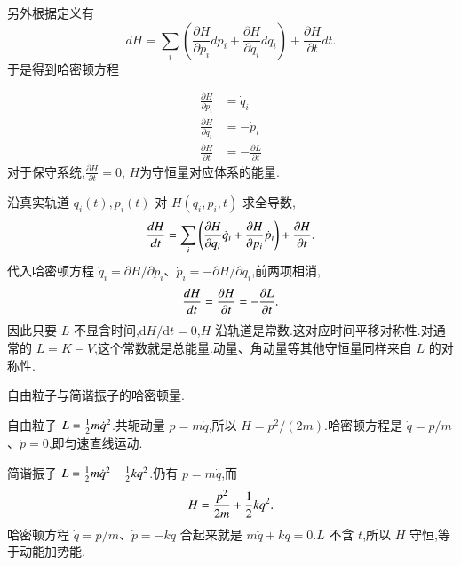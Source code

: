 另外根据定义有
\begin{equation}
    d H=\sum_i\left(\frac{\partial H}{\partial p_i} d p_i+\frac{\partial H}{\partial q_i} d q_i\right)+\frac{\partial H}{\partial t} d t .
\end{equation}
于是得到哈密顿方程

\begin{align}
    \frac{\partial H}{\partial p_i}&=\dot{q}_i
    \\
    \frac{\partial H}{\partial q_i}&=-\dot{p}_i
    \\
    \frac{\partial H}{\partial t}&=-\frac{\partial L}{\partial t}
\end{align}
对于保守系统,$\frac{\partial H}{\partial t}=0$, $H$为守恒量对应体系的能量.

沿真实轨道 $q_i(t),p_i(t)$ 对 $H(q_i,p_i,t)$ 求全导数,
\begin{equation}
  \frac{d{H}}{d{t}}
  = \sum_i\left( \frac{\partial{H}}{\partial{q_i}}\dot q_i + \frac{\partial{H}}{\partial{p_i}}\dot p_i \right)
    + \frac{\partial{H}}{\partial{t}}.
\end{equation}
代入哈密顿方程 $\dot q_i=\partial H/\partial p_i$、$\dot p_i=-\partial H/\partial q_i$,前两项相消,
\begin{equation}
  \frac{d{H}}{d{t}} = \frac{\partial{H}}{\partial{t}} = -\frac{\partial{L}}{\partial{t}}.
\end{equation}
因此只要 $L$ 不显含时间,$\mathrm{d}H/\mathrm{d}t=0$,$H$ 沿轨道是常数.这对应时间平移对称性.对通常的 $L=K-V$,这个常数就是总能量.动量、角动量等其他守恒量同样来自 $L$ 的对称性.

\begin{example}
自由粒子与简谐振子的哈密顿量.
\end{example}
\begin{solution}
自由粒子 $L={\frac{1}{2}} m\dot q^2$.共轭动量 $p=m\dot q$,所以 $H=p^2/(2m)$.哈密顿方程是 $\dot q=p/m$、$\dot p=0$,即匀速直线运动.

简谐振子 $L={\frac{1}{2}} m\dot q^2-{\frac{1}{2}} k q^2$.仍有 $p=m\dot q$,而
\begin{equation}
  H = \frac{p^2}{2m} + {\frac{1}{2}} k q^2.
\end{equation}
哈密顿方程 $\dot q=p/m$、$\dot p=-kq$ 合起来就是 $m\ddot q+kq=0$.$L$ 不含 $t$,所以 $H$ 守恒,等于动能加势能.
\end{solution}